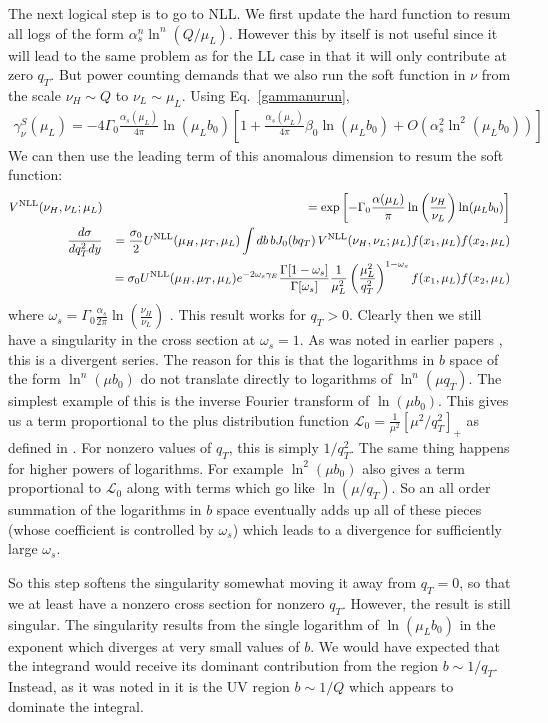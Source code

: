 \documentclass[a4,letterpaper,11pt]{article}
\newcommand{\nn}{\nonumber}
\newcommand{\bea}{\begin{eqnarray}}
\newcommand{\eea}{\end{eqnarray}}
\newcommand{\as}{\alpha_s}
\newcommand{\cL}{\mathcal{L}}
\newcommand{\eq}[1]{Eq.~\eqref{#1}}
\begin{document}
The next logical step is to go to NLL. We first update the hard function to resum all logs of the form $\alpha_s^n \ln^n(Q/\mu_L)$. However this by itself is not useful since it will lead to the same problem as for the LL case in that it will only contribute at zero $q_T$. But power counting demands that we also run the soft function in $\nu$ from the scale $\nu_H \sim Q$ to $\nu_L \sim \mu_L$.  Using \eq{gammanurun}, 
\bea \label{gamS}
\gamma_{\nu}^S (\mu_L)= -4\Gamma_0\frac{\as(\mu_L)}{4\pi}\ln(\mu_L b_0)
\left[1+ \frac{\as(\mu_L)}{4\pi}  \beta_0 \ln(\mu_L b_0) + O\left(\as^2\ln^2(\mu_L b_0)\right) \right ]
\eea
We can then use the leading term of this anomalous dimension to resum the soft function:
\bea
\label{softNLL}
V^{\rm NLL}(\nu_H,\nu_L;\mu_L) &&= \exp\left[ -\Gamma_0 \frac{\alpha(\mu_L)}{\pi}\ln\left(\frac{\nu_H}{\nu_L}\right)\ln(\mu_L b_0) \right] \\
 \frac{d \sigma}{d q_T^2 dy} &&=\frac{\sigma_0}{2}  U^{\rm NLL}(\mu_H, \mu_T, \mu_L)\int db\, b J_0(b q_T) \,V^{\rm NLL}(\nu_H,\nu_L;\mu_L)f(x_1,\mu_L)f(x_2,\mu_L) \nn\\
&&= \sigma_0 U^{\rm NLL}(\mu_H, \mu_T, \mu_L) e^{-2 \omega_s \gamma_E} \frac{ \Gamma[1- \omega_s]}{\Gamma[\omega_s]} \frac{1}{\mu_L^2} \left(\frac{\mu_L^2}{q_T^2}\right)^{1-\omega_s}f(x_1,\mu_L)f(x_2,\mu_L) \nn
\eea
where $\omega_s= \Gamma_0\frac{\as}{2\pi}\ln\left(\frac{\nu_H}{\nu_L}\right)$ .  This result works for $q_T >0 $.  Clearly then we still have a singularity in the cross section at $\omega_s = 1$. As was noted in earlier papers \cite{Chiu:2012ir}, this is a divergent series. The reason for this is that the logarithms in $b$ space of the form $\ln^n( \mu b_0)$ do not translate directly to logarithms of $\ln^n(\mu q_T)$. The simplest example of this is the inverse Fourier transform of $\ln(\mu b_0)$. This gives us a term proportional to the plus distribution function $ \cL_0 =\tfrac{1}{\mu^2}\left[\mu ^2/q_T^2\right]_+$ as defined in \cite{Chiu:2012ir}. For nonzero values of $q_T$, this is simply $1/q_T^2$. The same thing happens for higher powers of logarithms. For example $\ln^2(\mu b_0)$ also gives a term proportional to   $\cL_0$  along with terms which go like $\ln(\mu /q_T)$. So an all order summation of the logarithms in $b$ space eventually adds up all of these pieces (whose coefficient is controlled by $\omega_s$) which leads to a divergence for sufficiently large $\omega_s$. 

So this step softens the singularity somewhat  moving it away from $q_T =0$, so that we at least have a nonzero cross section for nonzero $q_T$. However, the result is still singular. The singularity results from the single logarithm of $\ln(\mu_L b_0)$ in the exponent which diverges at very small values of $b$. We would have expected that the integrand would receive its dominant contribution from the region $b \sim 1/q_T$. Instead, as it was noted in \cite{Chiu:2012ir} it is the UV region $b\sim 1/Q$ which appears to dominate the integral.
\end{document}
